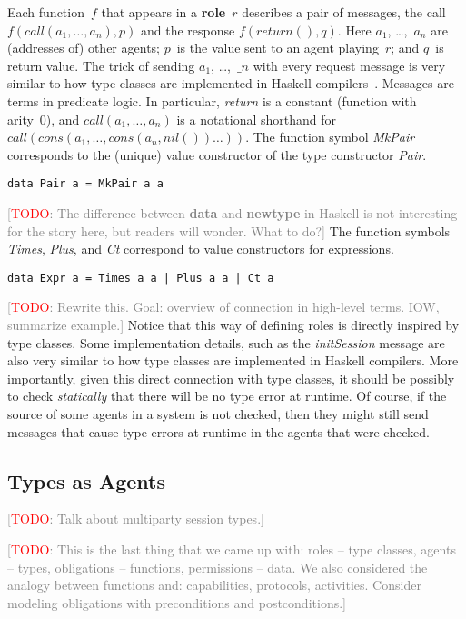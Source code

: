 \documentclass[conference,compsoc]{IEEEtran} %
\newcommand{\todo}[1]{{\small \textcolor{gray}{[\textcolor{red}{TODO}: #1]}}}
\begin{document}
Each function~$f$ that appears in a \textbf{role}~$r$ describes a pair of
messages, the call $f(\mathit{call}(a_1,\ldots,a_n),p)$ and the response
$f(\mathit{return}(),q)$. Here $a_1$, \dots,~$a_n$ are (addresses of) other
agents; $p$~is the value sent to an agent playing~$r$; and $q$~is return
value. The trick of sending $a_1$, \dots,~$\_n$ with every request message
is very similar to how type classes are implemented in Haskell
compilers~\cite{DBLP:journals/toplas/HallHJW96}.
Messages are terms in predicate logic. In particular,
\textit{return} is a constant (function with arity~0), and
$\mathit{call}(a_1,\ldots,a_n)$ is a notational shorthand for
$\mathit{call}(\mathit{cons}(a_1,\ldots,\mathit{cons}(a_n,\mathit{nil}())\ldots))$.
The function symbol \textit{MkPair} corresponds to the (unique) value
constructor of the type constructor \textit{Pair}.
\begin{lstlisting}[style=hs]
data Pair a = MkPair a a
\end{lstlisting}
\todo{The difference between \textbf{data} and \textbf{newtype} in Haskell
is not interesting for the story here, but readers will wonder. What to
do?} The function symbols \textit{Times}, \textit{Plus}, and \textit{Ct}
correspond to value constructors for expressions.
\begin{lstlisting}[style=hs]
data Expr a = Times a a | Plus a a | Ct a
\end{lstlisting}

\todo{Rewrite this. Goal: overview of connection in high-level terms. IOW,
summarize example.}
Notice that this way of defining roles is directly inspired by type
classes. Some implementation details, such as the \textit{initSession}
message are also very similar to how type classes are implemented in
Haskell compilers. More importantly, given this direct connection with type
classes, it should be possibly to check \emph{statically} that there will
be no type error at runtime. Of course, if the source of some agents in a
system is not checked, then they might still send messages that cause type
errors at runtime in the agents that were checked.


\subsection{Types as Agents} %

\todo{Talk about multiparty session types.}

\todo{This is the last thing that we came up with: roles -- type classes, agents -- types, obligations -- functions, permissions -- data. We also considered the analogy between functions and: capabilities, protocols, activities. Consider modeling obligations with preconditions and postconditions.}
\end{document}
